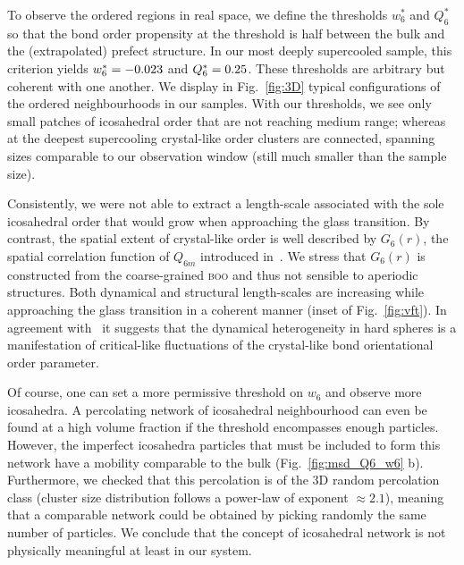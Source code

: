 To observe the ordered regions in real space, we define the thresholds $w_6^*$ and $Q_6^*$ so that the bond order propensity at the threshold is half between the bulk and the (extrapolated) prefect structure. In our most deeply supercooled sample, this criterion yields $w_6^* = -0.023$ and $Q_6^* = 0.25$. These thresholds are arbitrary but coherent with one another. We display in Fig.~\ref{fig:3D} typical configurations of the ordered neighbourhoods in our samples. With our thresholds, we see only small patches of icosahedral order that are not reaching medium range; whereas at the deepest supercooling crystal-like order clusters are connected, spanning sizes comparable to our observation window (still much smaller than the sample size).



Consistently, we were not able to extract a length-scale associated with the sole icosahedral order that would grow when approaching the glass transition. By contrast, the spatial extent of crystal-like order is well described by $G_6(r)$, the spatial correlation function of $Q_{6 m}$ introduced in~\citep{tanaka2010critical}. We stress that $G_6(r)$ is constructed from the coarse-grained \textsc{boo} and thus not sensible to aperiodic structures. Both dynamical and structural length-scales are increasing while approaching the glass transition in a coherent manner (inset of Fig.~\ref{fig:vft}). In agreement with~\citep{tanaka2010critical} it suggests that the dynamical heterogeneity in hard spheres is a manifestation of critical-like fluctuations of the crystal-like bond orientational order parameter.

Of course, one can set a more permissive threshold on $w_6$ and observe more icosahedra. A percolating network of icosahedral neighbourhood can even be found at a high volume fraction if the threshold encompasses enough particles. However, the imperfect icosahedra particles that must be included to form this network have a mobility comparable to the bulk (Fig.~\ref{fig:msd_Q6_w6} b). Furthermore, we checked that this percolation is of the 3D random percolation class (cluster size distribution follows a power-law of exponent $\approx 2.1$), meaning that a comparable network could be obtained by picking randomly the same number of particles. We conclude that the concept of icosahedral network is not physically meaningful at least in our system.



